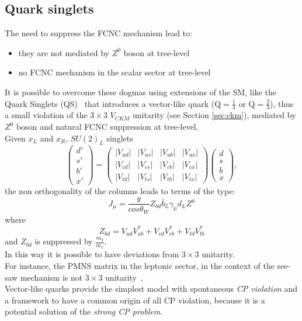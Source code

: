\subsection{Quark singlets}
The need to suppress the FCNC mechanism lead to:
\begin{itemize}
	\item they are not mediated by $Z^0$ boson at tree-level
	\item no FCNC mechanism in the scalar sector at tree-level 
\end{itemize}
It is possible to overcome these dogmas using extensions of the SM, like the Quark Singlets (QS)~\cite{barger} that introduces a vector-like quark ($\mathrm{Q=\frac{1}{3}}$ or $\mathrm{Q=\frac{2}{3}}$), thus a small violation of the $\mathrm{3 \times 3}$ $V_{CKM}$ unitarity (see Section \ref{sec:ckm}), mediated by $Z^0$ boson and natural 
FCNC suppression at tree-level.
\vspace{\baselineskip}
\\Given $x_L$ and $x_R$, $SU(2)_{L}$ singlets
\begin{equation}
\begin{pmatrix}
d' \\ 
s' \\ 
b' \\
x' 
\end{pmatrix} 
=
\begin{pmatrix}
|V_{ud}| & |V_{us}| & |V_{ub}|  & |V_{ux}| \\ 
|V_{cd}| & |V_{cs}| & |V_{cb}|   & |V_{cx}| \\ 
|V_{td}| & |V_{ts}|  &| V_{tb}|   & |V_{tx}|
\end{pmatrix} 
\begin{pmatrix}
d \\ 
s \\ 
b \\
x
\end{pmatrix} ,
\end{equation}
the non orthogonality of the columns leads to terms of the type:
\begin{equation}
J_{\mu}= \frac{g}{cos\theta_W}Z_{bd}\bar{b}_{L}\gamma_{\mu}d_{L}Z^{\mu}
\end{equation}
where
\begin{equation}
Z_{bd}=V_{ud}V^*_{ub}+V_{cd}V^*_{cb}+V_{td}V^*_{tb}
\end{equation}
and $Z_{bd}$ is suppressed by $\frac{m_q}{m_x}$.
\vspace{\baselineskip}
\\In this way it is possible to have deviations from $\mathrm{3 \times 3}$ unitarity.\\
For instance, the PMNS matrix in the leptonic sector, in the context of the see-saw mechanism is not  $\mathrm{3 \times 3}$ unitarity~\cite{pnms}.
\\Vector-like quarks provide the simplest model with spontaneous \textit{CP violation} and a framework to have a common origin
of all CP violation, because it is a potential solution of the \textit{strong CP problem}.

